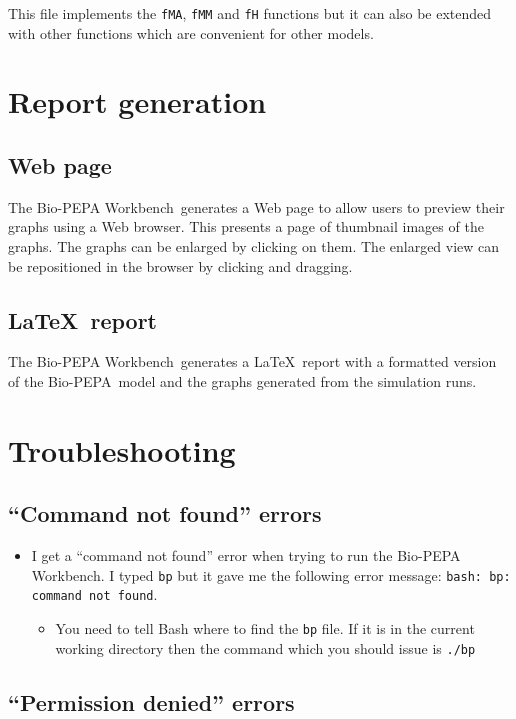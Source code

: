 \documentclass[11pt,a4paper]{article}
\newcommand{\BioPEPA}{Bio-PEPA}
\newcommand{\BPWB}{{\BioPEPA} Workbench}
\begin{document}
This file implements the \texttt{fMA}, \texttt{fMM} and \texttt{fH}
functions but it can also be extended with other functions which are
convenient for other models.

\section{Report generation}

\subsection{Web page}

The \BPWB\ generates a Web page to allow users to preview their graphs
using a Web browser.  This presents a page of thumbnail images of the
graphs.  The graphs can be enlarged by clicking on them.  The enlarged
view can be repositioned in the browser by clicking and dragging.

\subsection{\LaTeX\ report}

The \BPWB\ generates a \LaTeX\ report with a formatted version of the
\BioPEPA\ model and the graphs generated from the simulation runs.

\section{Troubleshooting}

\subsection{``Command not found'' errors}

\begin{itemize}
\item I get a ``command not found'' error when trying to run the \BPWB.
      I typed \texttt{bp} but it gave me the following 
      error message: \texttt{bash: bp: command not found}.
      \begin{itemize}
      \item You need to tell Bash where to find the \texttt{bp}
         file.  If it is in the current working directory then the
         command which you should issue is \texttt{./bp}
      \end{itemize}
\end{itemize}

\subsection{``Permission denied'' errors}
\end{document}
